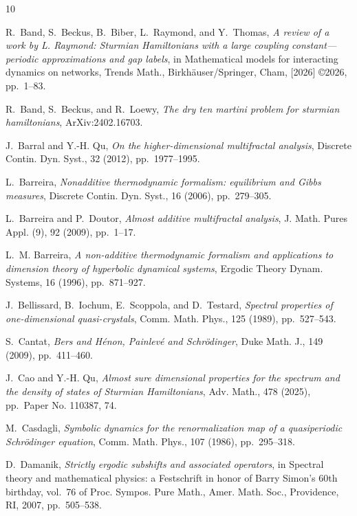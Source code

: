 \documentclass[reqno,11pt,graphicx,]{amsart}
\numberwithin{equation}{section}
\theoremstyle{plain}
\newcommand{\3}{\mathbf{3}}
\begin{document}
\begin{thebibliography}{10}

{\sc R.~Band, S.~Beckus, B.~Biber, L.~Raymond, and Y.~Thomas}, {\em A review of
  a work by {L}. {R}aymond: {S}turmian {H}amiltonians with a large coupling
  constant---periodic approximations and gap labels}, in Mathematical models
  for interacting dynamics on networks, Trends Math., Birkh\"auser/Springer,
  Cham, [2026] \copyright 2026, pp.~1--83.

{\sc R.~Band, S.~Beckus, and R.~Loewy}, {\em The dry ten martini problem for
  sturmian hamiltonians}, ArXiv:2402.16703.

{\sc J.~Barral and Y.-H. Qu}, {\em On the higher-dimensional multifractal
  analysis}, Discrete Contin. Dyn. Syst., 32 (2012), pp.~1977--1995.

{\sc L.~Barreira}, {\em Nonadditive thermodynamic formalism: equilibrium and
  {G}ibbs measures}, Discrete Contin. Dyn. Syst., 16 (2006), pp.~279--305.

{\sc L.~Barreira and P.~Doutor}, {\em Almost additive multifractal analysis},
  J. Math. Pures Appl. (9), 92 (2009), pp.~1--17.

{\sc L.~M. Barreira}, {\em A non-additive thermodynamic formalism and
  applications to dimension theory of hyperbolic dynamical systems}, Ergodic
  Theory Dynam. Systems, 16 (1996), pp.~871--927.

{\sc J.~Bellissard, B.~Iochum, E.~Scoppola, and D.~Testard}, {\em Spectral
  properties of one-dimensional quasi-crystals}, Comm. Math. Phys., 125 (1989),
  pp.~527--543.

{\sc S.~Cantat}, {\em Bers and {H}\'{e}non, {P}ainlev\'{e} and
  {S}chr\"{o}dinger}, Duke Math. J., 149 (2009), pp.~411--460.

{\sc J.~Cao and Y.-H. Qu}, {\em Almost sure dimensional properties for the
  spectrum and the density of states of {S}turmian {H}amiltonians}, Adv. Math.,
  478 (2025), pp.~Paper No. 110387, 74.

{\sc M.~Casdagli}, {\em Symbolic dynamics for the renormalization map of a
  quasiperiodic {S}chr\"{o}dinger equation}, Comm. Math. Phys., 107 (1986),
  pp.~295--318.

{\sc D.~Damanik}, {\em Strictly ergodic subshifts and associated operators}, in
  Spectral theory and mathematical physics: a {F}estschrift in honor of {B}arry
  {S}imon's 60th birthday, vol.~76 of Proc. Sympos. Pure Math., Amer. Math.
  Soc., Providence, RI, 2007, pp.~505--538.


\end{thebibliography}
\end{document}
